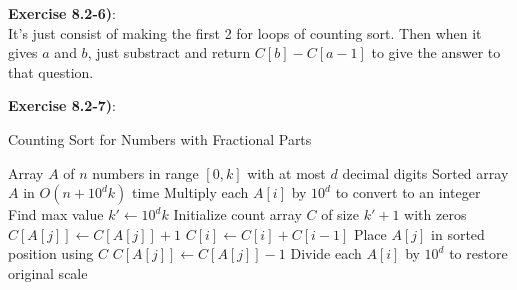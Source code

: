 \documentclass{article}
\newcounter{exercise}[section]   %
\begin{document}
\textbf{Exercise 8.2-6)}:\\
It's just consist of making the first 2 for loops of counting sort. Then when it gives 
\(a\) and \(b\), just substract and return \(C[b] - C[a - 1]\) to give the answer to that 
question.

\newpage
{}
\textbf{Exercise 8.2-7)}:\\
\begin{algorithm}
    \caption{Counting Sort for Numbers with Fractional Parts}
    \begin{algorithmic}[1]
        \Require Array $A$ of $n$ numbers in range $[0, k]$ with at most $d$ decimal digits
        \Ensure Sorted array $A$ in $O(n + 10^d k)$ time
        \State Multiply each $A[i]$ by $10^d$ to convert to an integer
        \State Find max value $k' \gets 10^d k$
        \State Initialize count array $C$ of size $k' + 1$ with zeros
        \State $C[A[j]] \gets C[A[j]] + 1$
        \EndFor
        \State $C[i] \gets C[i] + C[i-1]$
        \EndFor
        \State Place $A[j]$ in sorted position using $C$
        \State $C[A[j]] \gets C[A[j]] - 1$
        \EndFor
        \State Divide each $A[i]$ by $10^d$ to restore original scale
    \end{algorithmic}
\end{algorithm}
\end{document}
